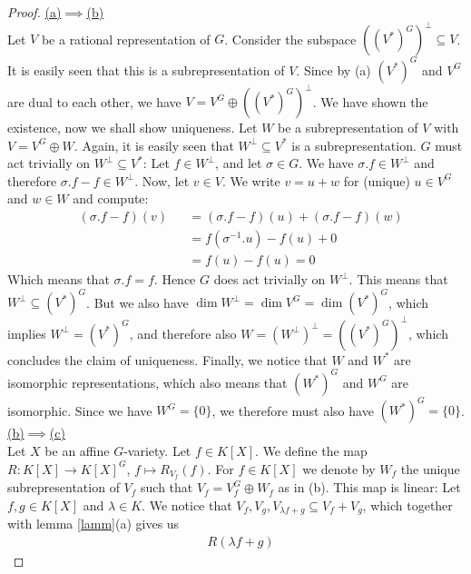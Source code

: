\begin{proof}
  \hfill \break
  \underline{(a)$\implies$(b)}\\
  Let $V$ be a rational representation of $G$.
  Consider the subspace $ ((V^\ast)^G)^\bot \subseteq V $.
  It is easily seen that this is a subrepresentation of $V$.
  Since by (a) $(V^\ast)^G$ and $V^G$ are dual to each other, we have $V = V^G \oplus ((V^\ast)^G)^\bot $.
  We have shown the existence, now we shall show uniqueness.
  Let $W$ be a subrepresentation of $V$ with $V = V^G \oplus W $.
  Again, it is easily seen that $W^\bot \subseteq V^\ast$ is a subrepresentation.
  $G$ must act trivially on $W^\bot \subseteq V^\ast$:
  Let $f \in W^\bot$, and let $\sigma \in G$.
  We have $\sigma.f \in W^\bot$ and therefore $\sigma.f - f \in W^\bot$.
  Now, let $v \in V$.
  We write $v = u + w$ for (unique) $u \in V^G$ and $w \in W$ and compute:
  \begin{equation}
    \begin{aligned}
      &(\sigma.f -f)(v)&&=(\sigma.f -f)(u) + (\sigma.f -f)(w)\\
      &&&=f(\sigma^{-1}.u) - f(u) + 0\\
      &&&=f(u)-f(u) = 0
    \end{aligned}
  \end{equation}
  Which means that $\sigma.f = f$.
  Hence $G$ does act trivially on $W^\bot$.
  This means that $W^\bot \subseteq (V^\ast)^G$.
  But we also have $\operatorname{dim}W^\bot = \operatorname{dim}V^G = \operatorname{dim}(V^\ast)^G$, which implies $W^\bot = (V^\ast)^G$, and therefore also $W = (W^\bot)^\bot = ((V^\ast)^G)^\bot$, which concludes the claim of uniqueness.
  Finally, we notice that $W$ and $W^\ast$ are isomorphic representations, which also means that $(W^\ast)^G$ and $W^G$ are isomorphic.
  Since we have $W^G = \{0\}$, we therefore must also have $(W^\ast)^G = \{0\}$.\\
  \underline{(b)$\implies$(c)}\\
  Let $X$ be an affine $G$-variety.
  Let $f \in K[X]$.
  We define the map $R \colon K[X] \rightarrow K[X]^G $, $ f \mapsto R_{V_f}(f)$.
  For $f \in K[X]$ we denote by $W_f$ the unique subrepresentation of $V_f$ such that $V_f = V_f^G \oplus W_f$ as in (b).
  This map is linear:
  Let $f,g \in K[X]$ and $\lambda \in K$.
  We notice that $V_f,V_g,V_{\lambda f + g} \subseteq V_f + V_g$, which together with lemma \ref{lamm}(a) gives us
  \begin{equation}
    \begin{aligned}
      &R(\lambda f +g)

\end{aligned}
\end{equation}
\end{proof}
